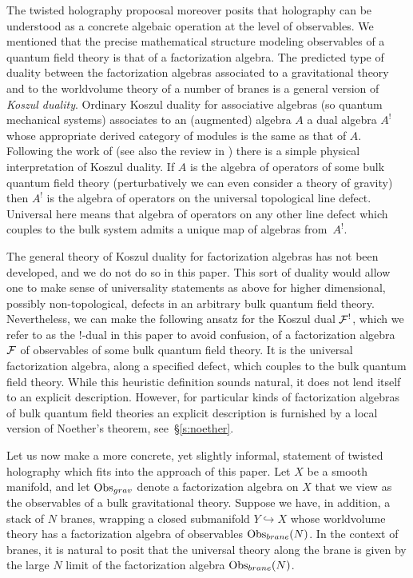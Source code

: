 The twisted holography propoosal moreover posits that holography can be understood as a concrete algebaic operation at the level of observables. We mentioned that the precise mathematical structure modeling observables of a quantum field theory is that of a factorization algebra. The predicted type of duality between the factorization algebras associated to a gravitational theory and to the worldvolume theory of a number of branes is a general version of \textit{Koszul duality}.
Ordinary Koszul duality for associative algebras (so quantum mechanical systems) associates to an (augmented) algebra $A$ a dual algebra $A^!$ whose appropriate derived category of modules is the same as that of $A$.
Following the work of \cite{CLsugra,CP1} (see also the review in \cite{PWkoszul}) there is a simple physical interpretation of Koszul duality.
If $A$ is the algebra of operators of some bulk quantum field theory (perturbatively we can even consider a theory of gravity) then $A^!$ is the algebra of operators on the universal topological line defect.
Universal here means that algebra of operators on any other line defect which couples to the bulk system admits a unique map of algebras from~$A^!$.

The general theory of Koszul duality for factorization algebras has not been developed, and we do not do so in this paper.
This sort of duality would allow one to make sense of universality statements as above for higher dimensional, possibly non-topological, defects in an arbitrary bulk quantum field theory.
Nevertheless, we can make the following ansatz for the Koszul dual $\mathcal F^!$, which we refer to as the $!$-dual in this paper to avoid confusion, of a factorization algebra~$\mathcal F$ of observables of some bulk quantum field theory.
It is the universal factorization algebra, along a specified defect, which couples to the bulk quantum field theory.
While this heuristic definition sounds natural, it does not lend itself to an explicit description.
However, for particular kinds of factorization algebras of bulk quantum field theories an explicit description is furnished by a local version of Noether's theorem, see~\S\ref{s:noether}.

Let us now make a more concrete, yet slightly informal, statement of twisted holography which fits into the approach of this paper.
Let $X$ be a smooth manifold, and let $\operatorname{Obs}_{grav}$ denote a factorization algebra on $X$ that we view as the observables of a bulk gravitational theory.
Suppose we have, in addition, a stack of $N$ branes, wrapping a closed submanifold $Y\hookrightarrow X$ whose worldvolume theory has a factorization algebra of observables $\operatorname{Obs}_{brane}(N)$.
In the context of branes, it is natural to posit that the universal theory along the brane is given by the large $N$ limit of the factorization algebra $\operatorname{Obs}_{brane}(N)$.

